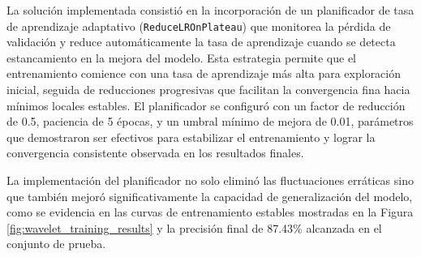 \vspace{5mm}

La solución implementada consistió en la incorporación de un planificador de tasa de aprendizaje adaptativo (\texttt{ReduceLROnPlateau}) que monitorea la pérdida de validación y reduce automáticamente la tasa de aprendizaje cuando se detecta estancamiento en la mejora del modelo. Esta estrategia permite que el entrenamiento comience con una tasa de aprendizaje más alta para exploración inicial, seguida de reducciones progresivas que facilitan la convergencia fina hacia mínimos locales estables. El planificador se configuró con un factor de reducción de 0.5, paciencia de 5 épocas, y un umbral mínimo de mejora de 0.01, parámetros que demostraron ser efectivos para estabilizar el entrenamiento y lograr la convergencia consistente observada en los resultados finales.

\vspace{5mm}

La implementación del planificador no solo eliminó las fluctuaciones erráticas sino que también mejoró significativamente la capacidad de generalización del modelo, como se evidencia en las curvas de entrenamiento estables mostradas en la Figura \ref{fig:wavelet_training_results} y la precisión final de 87.43\% alcanzada en el conjunto de prueba.

